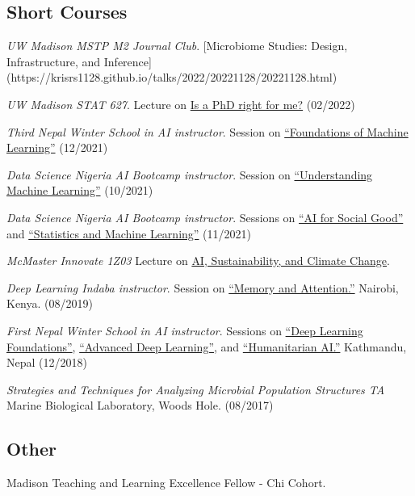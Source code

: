\documentclass[letterpaper]{article}
\renewenvironment{itemize}{
  \begin{list}{}{
    \setlength{\leftmargin}{1.5em}
  }
}{
  \end{list}
}
\begin{document}
\subsection*{Short Courses}
\begin{itemize}
\item \textit{UW Madison MSTP M2 Journal Club}. [Microbiome Studies: Design, Infrastructure, and Inference](https://krisrs1128.github.io/talks/2022/20221128/20221128.html)
\item \textit{UW Madison STAT 627}. Lecture on \href{https://drive.google.com/file/d/1kq0xJ3XS98igzxFcJOTFUEz2DtoRByCg/view?usp=sharing}{Is a PhD right for me?} (02/2022)
\item \textit{Third Nepal Winter School in AI instructor}. Session on
\href{https://krisrs1128.github.io/winter_school_2021/index.html}{``Foundations
of Machine Learning''} (12/2021)
\item \textit{Data Science Nigeria AI Bootcamp instructor}.
Session on \href{https://drive.google.com/file/d/1bgYQb8z1iCjHyOG1gVWeJJCSPdssndVP/view}{``Understanding Machine Learning''} (10/2021)
\item \textit{Data Science Nigeria AI Bootcamp instructor}.
Sessions on \href{https://www.youtube.com/watch?v=7_8DUN-6tpI&}{``AI for Social Good''} and \href{https://www.youtube.com/watch?v=EefWzpRkIVM}{``Statistics and Machine Learning''} (11/2021)
\item \textit{McMaster Innovate 1Z03} Lecture on
\href{https://docs.google.com/presentation/d/1JWV8_VXYzCzipr6EJZdcdaPY5pz2Cp4F/edit#slide=id.p1}{AI,
Sustainability, and Climate Change}.
\item \textit{Deep Learning Indaba instructor}.
Session on \href{https://www.youtube.com/watch?v=9mWYFZwNpis}{``Memory and Attention.''}
Nairobi, Kenya. (08/2019)
\item \textit{First Nepal Winter School in AI instructor}.
Sessions on \href{https://www.youtube.com/watch?v=3lBMxO2zmGg}{``Deep Learning Foundations''}, \href{https://www.youtube.com/watch?v=OLaX-jmRUwY}{``Advanced Deep Learning''}, and \href{https://www.youtube.com/watch?v=RXZyGwa4TpY}{``Humanitarian AI.''}
Kathmandu, Nepal (12/2018)
\item \textit{Strategies and Techniques for Analyzing Microbial Population Structures TA}
  Marine Biological Laboratory, Woods Hole.
  (08/2017)
\end{itemize}

\subsection*{Other}
\begin{itemize}
\item Madison Teaching and Learning Excellence Fellow - Chi Cohort.
\end{itemize}
\end{document}
